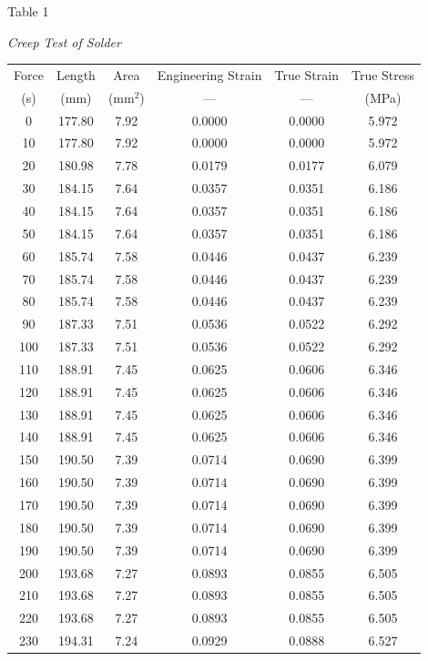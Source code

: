 \documentclass[12pt]{article}
\begin{document}
\begin{center}
Table 1 

\emph{Creep Test of Solder}

\begin{tabular}{ c c c c c c}
\hline
Force & Length & Area & Engineering Strain & True Strain & True Stress\\
(s) & (mm) & (mm$^2$) & --- & --- & (MPa)\\
\hline
0    & 177.80 & 7.92 & 0.0000 & 0.0000 & 5.972 \\
10   & 177.80 & 7.92 & 0.0000 & 0.0000 & 5.972 \\
20   & 180.98 & 7.78 & 0.0179 & 0.0177 & 6.079 \\
30   & 184.15 & 7.64 & 0.0357 & 0.0351 & 6.186 \\
40   & 184.15 & 7.64 & 0.0357 & 0.0351 & 6.186 \\
50   & 184.15 & 7.64 & 0.0357 & 0.0351 & 6.186 \\
60   & 185.74 & 7.58 & 0.0446 & 0.0437 & 6.239 \\
70   & 185.74 & 7.58 & 0.0446 & 0.0437 & 6.239 \\
80   & 185.74 & 7.58 & 0.0446 & 0.0437 & 6.239 \\
90   & 187.33 & 7.51 & 0.0536 & 0.0522 & 6.292 \\
100  & 187.33 & 7.51 & 0.0536 & 0.0522 & 6.292 \\
110  & 188.91 & 7.45 & 0.0625 & 0.0606 & 6.346 \\
120  & 188.91 & 7.45 & 0.0625 & 0.0606 & 6.346 \\
130  & 188.91 & 7.45 & 0.0625 & 0.0606 & 6.346 \\
140  & 188.91 & 7.45 & 0.0625 & 0.0606 & 6.346 \\
150  & 190.50 & 7.39 & 0.0714 & 0.0690 & 6.399 \\
160  & 190.50 & 7.39 & 0.0714 & 0.0690 & 6.399 \\
170  & 190.50 & 7.39 & 0.0714 & 0.0690 & 6.399 \\
180  & 190.50 & 7.39 & 0.0714 & 0.0690 & 6.399 \\
190  & 190.50 & 7.39 & 0.0714 & 0.0690 & 6.399 \\
200  & 193.68 & 7.27 & 0.0893 & 0.0855 & 6.505 \\
210  & 193.68 & 7.27 & 0.0893 & 0.0855 & 6.505 \\
220  & 193.68 & 7.27 & 0.0893 & 0.0855 & 6.505 \\
230  & 194.31 & 7.24 & 0.0929 & 0.0888 & 6.527 \\

\end{tabular}
\end{center}
\end{document}
